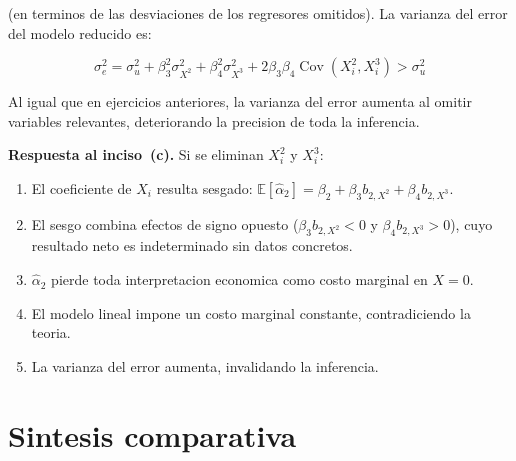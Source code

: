 \documentclass[12pt, letterpaper]{article}
\theoremstyle{remark}
\newcommand{\E}{\mathbb{E}}
\newcommand{\Cov}{\operatorname{Cov}}
\begin{document}
(en terminos de las desviaciones de los regresores omitidos). La varianza del
error del modelo reducido es:

\begin{equation}
  \sigma_e^2
    = \sigma_u^2
    + \beta_3^2 \sigma_{X^2}^2
    + \beta_4^2 \sigma_{X^3}^2
    + 2\beta_3\beta_4 \Cov(X_i^2, X_i^3)
    > \sigma_u^2
  \label{eq:var_error_red}
\end{equation}

Al igual que en ejercicios anteriores, la varianza del error aumenta al
omitir variables relevantes, deteriorando la precision de toda la inferencia.

\begin{clave}
  \textbf{Respuesta al inciso~(c).} Si se eliminan $X_i^2$ y $X_i^3$:
  \begin{enumerate}[leftmargin=1.4em, itemsep=4pt]
    \item El coeficiente de $X_i$ resulta sesgado:
      $\E[\hat\alpha_2] = \beta_2 + \beta_3 b_{2,X^2} + \beta_4 b_{2,X^3}$.
    \item El sesgo combina efectos de signo opuesto ($\beta_3 b_{2,X^2} < 0$
      y $\beta_4 b_{2,X^3} > 0$), cuyo resultado neto es indeterminado sin
      datos concretos.
    \item $\hat\alpha_2$ pierde toda interpretacion economica como costo
      marginal en $X = 0$.
    \item El modelo lineal impone un costo marginal constante, contradiciendo
      la teoria.
    \item La varianza del error aumenta, invalidando la inferencia.
  \end{enumerate}
\end{clave}

\section{Sintesis comparativa}
\end{document}
